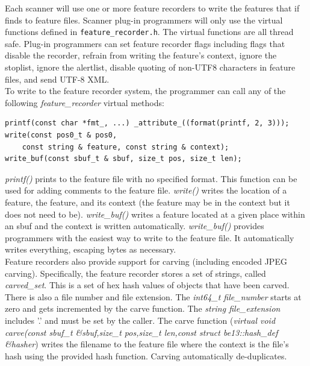 \documentclass[11pt,fleqn]{article} %
\begin{document}
Each scanner will use one or more feature recorders to write the features that if finds to feature files. Scanner plug-in programmers will only use the virtual functions defined in \texttt{feature\_recorder.h}. The virtual functions are all thread safe.   Plug-in programmers can set feature recorder flags including flags that disable the recorder,  refrain from writing the feature's context, ignore the stoplist, ignore the alertlist, disable quoting of non-UTF8 characters in feature files, and  send UTF-8 XML.\\  

To write to the feature recorder system, the programmer can call any of the following \textit{feature\_recorder} virtual methods:

\lstset{style=codelisting}
 \begin{lstlisting}
printf(const char *fmt_, ...) _attribute_((format(printf, 2, 3)));
write(const pos0_t & pos0, 
	const string & feature, const string & context);
write_buf(const sbuf_t & sbuf, size_t pos, size_t len); 
\end{lstlisting}
\textit{printf()} prints to the feature file with no specified format. This function can be used for adding comments to the feature file. \textit{write()} writes the location of a feature, the feature, and its context (the feature may be in the context but it does not need to be). \textit{write\_buf()} writes a feature located at a given place within an sbuf and the context is written automatically. \textit{write\_buf()} provides programmers with the easiest way to write to the feature file. It automatically writes everything, escaping bytes as necessary.\\
 
Feature recorders also provide support for carving (including encoded JPEG carving).   Specifically, the feature recorder stores a set of strings, called \textit{carved\_set}. This is a set of hex hash values of objects that have been carved. There is also a file number and file extension. The \textit{int64\_t file\_number} starts at zero and gets incremented by the carve function. The \textit{string file\_extension} includes '.' and must be set by the caller. The carve function (\textit{virtual void carve(const sbuf\_t \&sbuf,size\_t pos,size\_t len,const struct be13::hash\_def \&hasher}) writes the filename to the feature file where the context is the file's hash using the provided hash function. Carving automatically de-duplicates.
\\
\end{document}
